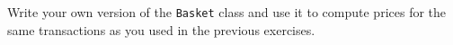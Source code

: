 %
%
\begin{question}
Write your own version of the \verb|Basket| class and use it to
compute prices for the same transactions as you used in the previous
exercises.
\end{question}
